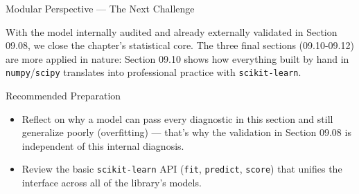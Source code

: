 \documentclass[10pt, aspectratio=169]{beamer}
\begin{document}
\begin{frame}{Modular Perspective --- The Next Challenge}
  \scriptsize
  \begin{retoclase}
    With the model internally audited and already externally validated in Section 09.08, we close the chapter's statistical core. The three final sections (09.10-09.12) are more applied in nature: Section 09.10 shows how everything built by hand in \texttt{numpy}/\texttt{scipy} translates into professional practice with \texttt{scikit-learn}.
  \end{retoclase}

  \vspace{0.08cm}
  \pause
  \begin{alertblock}{Recommended Preparation}
    \begin{itemize}\itemsep=0.06cm
      \item Reflect on why a model can pass every diagnostic in this section and still generalize poorly (overfitting) --- that's why the validation in Section 09.08 is independent of this internal diagnosis.
      \item Review the basic \texttt{scikit-learn} API (\texttt{fit}, \texttt{predict}, \texttt{score}) that unifies the interface across all of the library's models.
    \end{itemize}
  \end{alertblock}
\end{frame}
\end{document}
